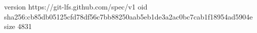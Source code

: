 version https://git-lfs.github.com/spec/v1
oid sha256:cb85db05125cfd78df56c7bb88250aab5eb1de3a2ac0bc7cab1f18954ad5904e
size 4831
